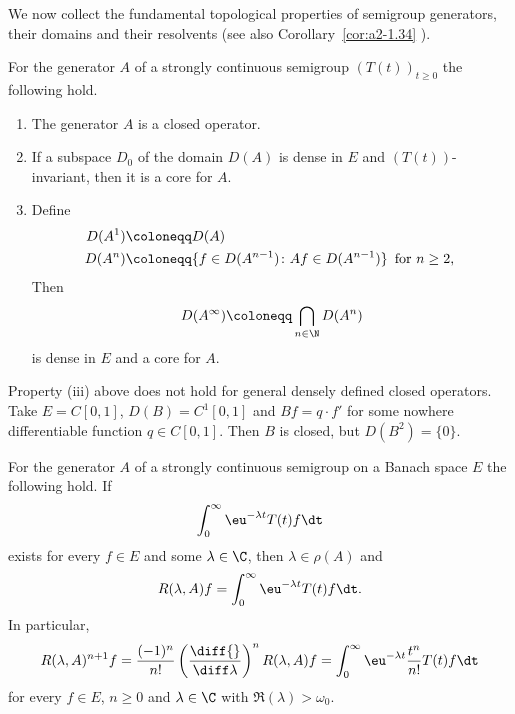 We now collect the fundamental topological properties of semigroup generators, their domains and their resolvents (see also Corollary~\ref{cor:a2-1.34} ).
\begin{proposition}\label{prop:a1-1.9}
For the generator $A$ of a strongly continuous semigroup $(T(t))_{t \geq 0}$ the following hold.
\begin{enumerate}[\upshape(i)]
\item 
The generator $A$ is a closed operator.

\item
If a subspace $D_{0}$ of the domain $D(A)$ is dense in $E$ and $(T(t))$-invariant, then it is a core for $A$.
\item Define 
%
\begin{align*}
	D(A^{1}) &\coloneqq D(A) \\
	D(A^{n}) &\coloneqq \{f \in D(A^{n-1}) \colon Af \in D(A^{n-1})\} \, \text{ for $ n \geq 2 $, }
\end{align*}
%
Then %
\[
	D(A^{\infty}) \coloneqq \bigcap_{n \in \N} D(A^{n})
\]
%
is dense in $E$ and a core for $A$.
\end{enumerate}
\end{proposition}
\begin{example}\label{ex:a1-1.10}
Property (iii) above does not hold for general densely defined closed operators.
Take $E = C\left[ 0,1 \right]$, $D(B) = C^{1}\left[ 0,1 \right]$ and $Bf = q \cdot f'$ for some nowhere differentiable function $q \in C\left[ 0,1 \right]$.
Then $B$ is closed, but $D(B^{2}) = \{0\}$.
\end{example}
\begin{proposition}\label{prop:a1-1.11}
For the generator $A$ of a strongly continuous semigroup on a Banach space $E$ the following hold.
If %
\[
	 \int_{0}^{\infty}  \eu^{-\lambda t}T(t)f \dt 
\]
%
exists for every $f \in E$ and some $\lambda \in \C$, then $\lambda \in \rho(A)$ and 
%
\[
	R(\lambda,A)f = \int_{0}^{\infty}  \eu^{-\lambda t}T(t)f  \dt.
\]
%
In particular,
\begin{equation}\label{eq:a1-1.7}
R(\lambda,A)^{n+1}f 
	= \frac{(-1)^{n}}{n!}\left(\frac{\diff{ }}{\diff\lambda}\right)^{n} R(\lambda,A)f 
	= \int_{0}^{\infty}  \eu^{-\lambda t}\frac{t^{n}}{n!}T(t)f  \dt
\end{equation}
for every $f \in E$, $n \geq 0$ and $\lambda \in \C$ with $\Re(\lambda) > \omega_{0}$.
\end{proposition}
